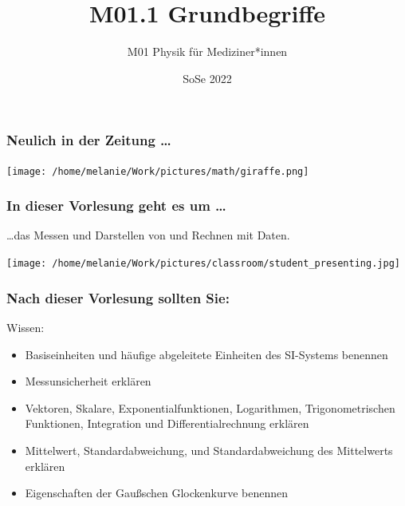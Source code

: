 \documentclass{beamer}
\title[M01.1 Grundbegriffe]{M01.1 Grundbegriffe}
\author[melanie.stefan@cantab.net]{M01 Physik für Mediziner*innen}
\institute[]{Prof. Melanie Stefan - melanie.stefan@cantab.net}
\date{SoSe 2022}
\begin{document}
 
\begin{frame}


  \maketitle 



\end{frame} 

\begin{frame}
\frametitle{Neulich in der Zeitung \dots}

\begin{center}
\texttt{[image: /home/melanie/Work/pictures/math/giraffe.png]}
\end{center}

 
\end{frame}

\begin{frame}
\frametitle{In dieser Vorlesung geht es um \dots}

\dots das \textcolor{theme}{Messen} und \textcolor{theme}{Darstellen} von und \textcolor{theme}{Rechnen} mit Daten.

\begin{center}
\texttt{[image: /home/melanie/Work/pictures/classroom/student\_presenting.jpg]}

\end{center}

 
\end{frame}




\begin{frame}

\frametitle{Nach dieser Vorlesung sollten Sie:}



\begin{block}{Wissen:}
\begin{itemize}
\item
Basiseinheiten und häufige abgeleitete Einheiten des SI-Systems benennen
\item
Messunsicherheit erklären
\item
 Vektoren, Skalare, Exponentialfunktionen, Logarithmen, Trigonometrischen Funktionen, Integration und Differentialrechnung erklären
\item 
Mittelwert, Standardabweichung, und Standardabweichung des Mittelwerts erklären 
\item
Eigenschaften der Gaußschen Glockenkurve benennen
\end{itemize}
\end{block}

\end{frame}
\end{document}
